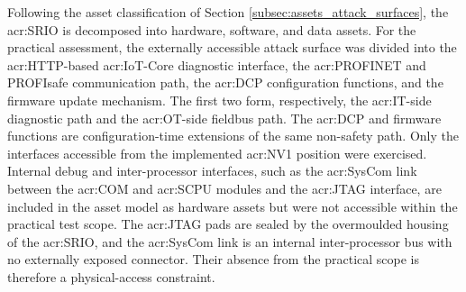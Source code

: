 Following the asset classification of Section \ref{subsec:assets_attack_surfaces}, the \gls{acr:SRIO} is decomposed into hardware, software, and data assets. For the practical assessment, the externally accessible attack surface was divided into the \gls{acr:HTTP}-based \gls{acr:IoT}-Core diagnostic interface, the \gls{acr:PROFINET} and PROFIsafe communication path, the \gls{acr:DCP} configuration functions, and the firmware update mechanism. The first two form, respectively, the \gls{acr:IT}-side diagnostic path and the \gls{acr:OT}-side fieldbus path. The \gls{acr:DCP} and firmware functions are configuration-time extensions of the same non-safety path. Only the interfaces accessible from the implemented \gls{acr:NV1} position were exercised. Internal debug and inter-processor interfaces, such as the \gls{acr:SysCom} link between the \gls{acr:COM} and \gls{acr:SCPU} modules and the \gls{acr:JTAG} interface, are included in the asset model as hardware assets but were not accessible within the practical test scope. The \gls{acr:JTAG} pads are sealed by the overmoulded housing of the \gls{acr:SRIO}, and the \gls{acr:SysCom} link is an internal inter-processor bus with no externally exposed connector. Their absence from the practical scope is therefore a physical-access constraint.


